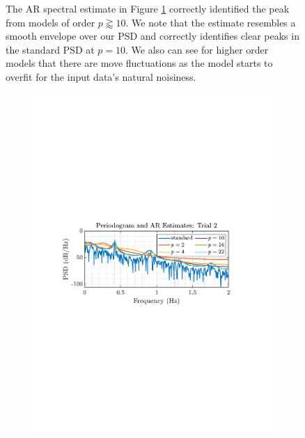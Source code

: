\documentclass[12pt]{article}
\numberwithin{equation}{section}
\begin{document}
\begin{figure}[H]
			\begin{minipage}{0.46\textwidth}
				The AR spectral estimate in Figure \ref{fig: 1-5c} correctly identified the peak from models of order $p\gtrapprox10$. We note that the estimate resembles a smooth envelope over our PSD and correctly identifies clear peaks in the standard PSD at $p=10$. We also can see for higher order models that there are move fluctuations as the model starts to overfit for the input data's natural noisiness. \\
			\end{minipage}%
			\begin{minipage}{0.04\textwidth}
				\hspace*{0.04\textwidth}
			\end{minipage}%
			\begin{minipage}{0.49\textwidth}
				\begin{subfigure}{\textwidth}
					\includegraphics[trim={2.2cm 11.2cm 3.15cm  11.2cm}, clip, width=\textwidth]{../MATLAB/figures/q1_5c_fig02.pdf} 
					\caption{}
				\end{subfigure}%
				\captionsetup{justification=centering}
				\label{fig: 1-5c}
			\end{minipage}%
		\end{figure}
	
\end{document}
